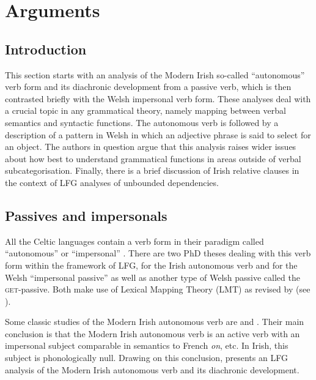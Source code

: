 \documentclass[output=paper,colorlinks,citecolor=brown]{langscibook}
\begin{document}
\section{Arguments}
\label{sec:Celtic:3}

\subsection{Introduction}
\label{sec:Celtic:3.1}

This section starts with an analysis of the Modern Irish so-called ``autonomous'' verb form and its diachronic development from a passive verb, which is then contrasted briefly with the Welsh impersonal verb form. These analyses deal with a crucial topic in any grammatical theory, namely mapping between verbal semantics and syntactic functions. The autonomous verb is followed by a description of a pattern in Welsh in which an adjective phrase is said to select for an object. The authors in question argue that this analysis raises wider issues about how best to understand grammatical functions in areas outside of verbal subcategorisation. Finally, there is a brief discussion of Irish relative clauses in the context of LFG analyses of unbounded dependencies.

\subsection{Passives and impersonals}
\label{sec:Celtic:3.2}

All the Celtic languages contain a verb form in their paradigm called ``auton\-o\-mous'' or ``impersonal'' \citep[14]{Fife2002}. There are two PhD theses dealing with this verb form within the framework of LFG, \citet{Graver2010} for the Irish autonomous verb and \citet{Arman2015} for the Welsh ``impersonal passive'' as well as another type of Welsh passive called the \textsc{get}-passive. Both make use of Lexical Mapping Theory (LMT) as revised by \citet{Kibort2007,kibort14} (see ).

Some classic studies of the Modern Irish autonomous verb are \citet{Stenson1989} and \citet{McCloskey2007}. Their main conclusion is that the Modern Irish autonomous verb is an active verb with an impersonal subject comparable in semantics to French \emph{on}, etc. In Irish, this subject is phonologically null. Drawing on this conclusion, \citet{Graver2010,Graver2011} presents an LFG analysis of the Modern Irish autonomous verb and its diachronic development.
\end{document}
